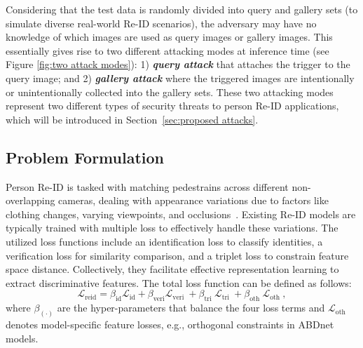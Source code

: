 \documentclass[sigconf,authordraft]{acmart}
\begin{document}
Considering that the test data is randomly divided into query and gallery sets (to simulate diverse real-world Re-ID scenarios), the adversary may have no knowledge of which images are used as query images or gallery images. This essentially gives rise to two different attacking modes at inference time (see Figure \ref{fig:two attack modes}): 1) \textbf{\emph{query attack}} that attaches the trigger to the query image; and 2) \textbf{\emph{gallery attack}} where the triggered images are intentionally or unintentionally collected into the gallery sets. These two attacking modes represent two different types of security threats to person Re-ID applications, which will be introduced in Section~\ref{sec:proposed attacks}.

\subsection{Problem Formulation}\label{sec:problem formulation}
Person Re-ID is tasked with matching pedestrains across different non-overlapping cameras, dealing with appearance variations due to factors like clothing changes, varying viewpoints, and occlusions~\cite{zhang2020relation,sun2018beyond,chen2019abd,he2021transreid}. 
Existing Re-ID models are typically trained with multiple loss to effectively handle these variations. The utilized loss functions include an 
identification loss to classify identities, a verification loss for similarity comparison, and a triplet loss to constrain feature space distance. Collectively, they facilitate effective representation learning to extract discriminative features.
The total loss function can be defined as follows:
\begin{equation}
\mathcal{L}_{\text {reid}}=\beta_{\text {id}} \mathcal{L}_{\text {id}}+\beta_{\text {veri}} \mathcal{L}_{\text {veri }}+\beta_{\text {tri }} \mathcal{L}_{\text {tri }}+\beta_{\text {oth }} \mathcal{L}_{\text {oth }},
\end{equation}
where $\beta_{(\cdot)}$ are the hyper-parameters that balance the four loss terms and $\mathcal{L}_{\text {oth}}$ denotes model-specific feature losses, e.g., orthogonal constraints in ABDnet~\cite{chen2019abd} models.
\end{document}
